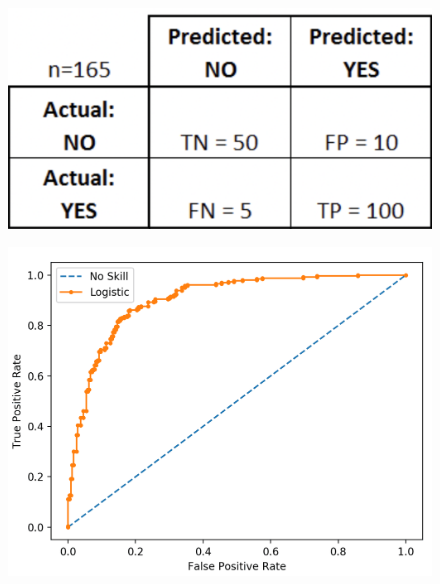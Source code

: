 \begin{frame}
   \vspace{.3cm}
   \hspace{.2cm}
   \begin{minipage}{0.48\linewidth}
      \begin{figure}[H]
         \includegraphics[scale=.17]{../images/illustrations/model_confusion_matrix.png}
      \end{figure}
   \end{minipage}
   \begin{minipage}{0.38\linewidth}
      \begin{figure}[H]
         \includegraphics[scale=.09]{../images/illustrations/model_roc_curve.png}
      \end{figure}
   \end{minipage}
\end{frame}


